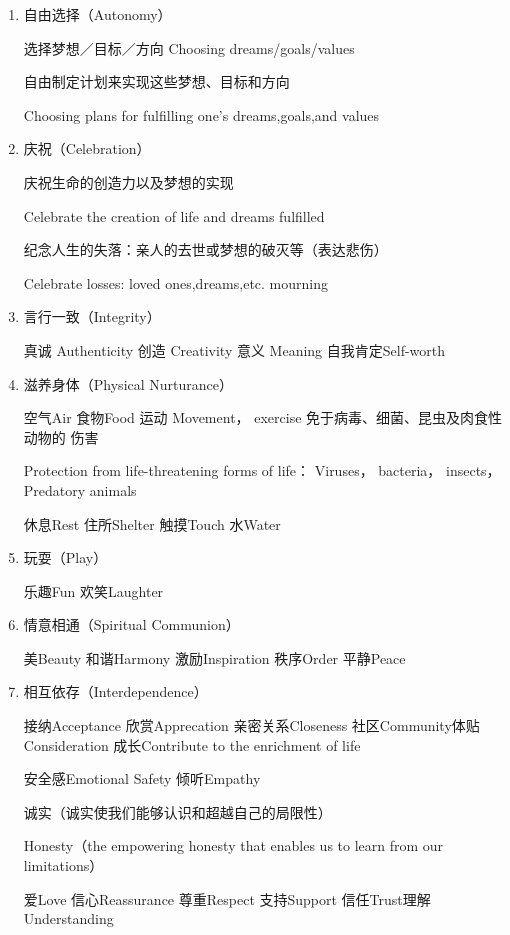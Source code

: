 \documentclass{ctexart}
\begin{document}
\begin{enumerate}[label=\arabic*),parsep=1em]
	\item 自由选择（Autonomy）

	      选择梦想／目标／方向 Choosing dreams/goals/values

	      自由制定计划来实现这些梦想、目标和方向

	      Choosing plans for fulfilling one's dreams,goals,and values

	\item 庆祝（Celebration）

	      庆祝生命的创造力以及梦想的实现

	      Celebrate the creation of life and dreams fulfilled

	      纪念人生的失落：亲人的去世或梦想的破灭等（表达悲伤）

	      Celebrate losses: loved ones,dreams,etc. mourning

	\item 言行一致（Integrity）

	      真诚 Authenticity 创造 Creativity 意义 Meaning 自我肯定Self-worth

	\item 滋养身体（Physical Nurturance）

	      空气Air 食物Food 运动 Movement， exercise 免于病毒、细菌、昆虫及肉食性动物的
	      伤害

	      Protection from life-threatening forms of life： Viruses， bacteria，
	      insects， Predatory animals

	      休息Rest 住所Shelter 触摸Touch 水Water
	\item 玩耍（Play）

	      乐趣Fun 欢笑Laughter
	\item 情意相通（Spiritual Communion）

	      美Beauty 和谐Harmony 激励Inspiration 秩序Order 平静Peace
	\item 相互依存（Interdependence）

	      接纳Acceptance 欣赏Apprecation 亲密关系Closeness 社区Community体贴
	      Consideration 成长Contribute to the enrichment of life

	      安全感Emotional Safety 倾听Empathy

	      诚实（诚实使我们能够认识和超越自己的局限性）

	      Honesty（the empowering honesty that enables us to learn from our
	      limitations）

	      爱Love 信心Reassurance 尊重Respect 支持Support 信任Trust理解Understanding
\end{enumerate}
\end{document}
